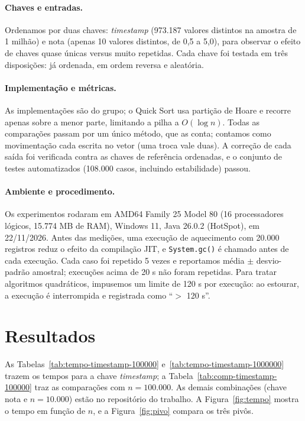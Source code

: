 \documentclass[12pt]{article}
\begin{document}
\paragraph{Chaves e entradas.} Ordenamos por duas chaves: \emph{timestamp} (973.187 valores distintos na amostra de 1 milh\~ao) e nota (apenas 10 valores distintos, de 0,5 a 5,0), para observar o efeito de chaves quase \'unicas versus muito repetidas. Cada chave foi testada em tr\^es disposi\c{c}\~oes: j\'a ordenada, em ordem reversa e aleat\'oria.

\paragraph{Implementa\c{c}\~ao e m\'etricas.} As implementa\c{c}\~oes s\~ao do grupo; o Quick Sort usa parti\c{c}\~ao de Hoare e recorre apenas sobre a menor parte, limitando a pilha a $O(\log n)$. Todas as compara\c{c}\~oes passam por um \'unico m\'etodo, que as conta; contamos como movimenta\c{c}\~ao cada escrita no vetor (uma troca vale duas). A corre\c{c}\~ao de cada sa\'ida foi verificada contra as chaves de refer\^encia ordenadas, e o conjunto de testes automatizados (108.000 casos, incluindo estabilidade) passou.

\paragraph{Ambiente e procedimento.} Os experimentos rodaram em AMD64 Family 25 Model 80 (16 processadores l\'ogicos, 15.774 MB de RAM), Windows 11, Java 26.0.2 (HotSpot), em 22/11/2026. Antes das medi\c{c}\~oes, uma execu\c{c}\~ao de aquecimento com 20.000 registros reduz o efeito da compila\c{c}\~ao JIT, e \texttt{System.gc()} \'e chamado antes de cada execu\c{c}\~ao. Cada caso foi repetido 5 vezes e reportamos m\'edia $\pm$ desvio-padr\~ao amostral; execu\c{c}\~oes acima de 20 s n\~ao foram repetidas. Para tratar algoritmos quadr\'aticos, impusemos um limite de 120 s por execu\c{c}\~ao: ao estourar, a execu\c{c}\~ao \'e interrompida e registrada como ``$>$ 120 s''.

\section{Resultados}

As Tabelas~\ref{tab:tempo-timestamp-100000} e~\ref{tab:tempo-timestamp-1000000} trazem os tempos para a chave \emph{timestamp}; a Tabela~\ref{tab:comp-timestamp-100000} traz as compara\c{c}\~oes com $n=100.000$. As demais combina\c{c}\~oes (chave nota e $n=10.000$) est\~ao no reposit\'orio do trabalho. A Figura~\ref{fig:tempo} mostra o tempo em fun\c{c}\~ao de $n$, e a Figura~\ref{fig:pivo} compara os tr\^es piv\^os.
\end{document}
